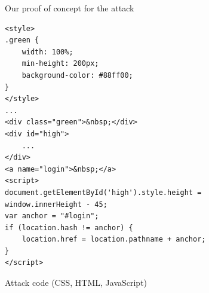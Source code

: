 \documentclass[twoside,letterpaper]{soups}
\begin{document}

\begin{figure}
\centering
{}
\caption{Our proof of concept for the attack}
\label{fig:proof-of-concept}
\end{figure}

\begin{figure}\label{fig:attack-code}
\begin{lstlisting}
<style>
.green {
    width: 100%;
    min-height: 200px;
    background-color: #88ff00;
}
</style>
...
<div class="green">&nbsp;</div>
<div id="high">
    ...
</div>
<a name="login">&nbsp;</a>
<script>
document.getElementById('high').style.height = window.innerHeight - 45;
var anchor = "#login";
if (location.hash != anchor) {
    location.href = location.pathname + anchor;
}
</script>
\end{lstlisting}
\caption[]{Attack code (CSS, HTML, JavaScript)}
\end{figure}

\end{document}
